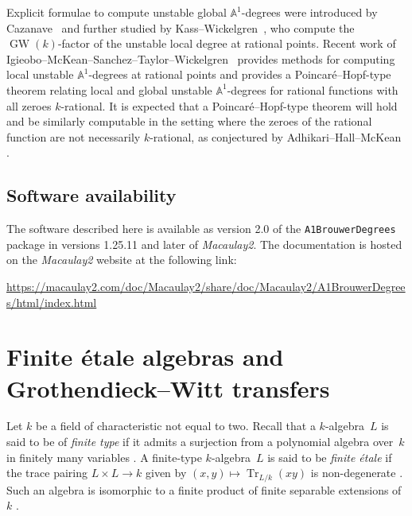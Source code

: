 \documentclass[12pt]{amsart}
\theoremstyle{definition}
\DeclareMathOperator{\GW}{GW}
\DeclareMathOperator{\Tr}{Tr}
\begin{document}
Explicit formulae to compute unstable global $\mathbb{A}^{1}$-degrees were introduced by Cazanave~\cite{Cazanave} and further studied by Kass--Wickelgren~\cite{KWClassical}, who compute the $\GW(k)$-factor of the unstable local degree at rational points. Recent work of Igieobo--McKean--Sanchez--Taylor--Wickelgren~\cite{IMSTW} provides methods for computing local unstable $\mathbb{A}^{1}$-degrees at rational points and provides a Poincar\'{e}--Hopf-type theorem relating local and global unstable $\mathbb{A}^{1}$-degrees for rational functions with all zeroes $k$-rational. It is expected that a Poincar\'{e}--Hopf-type theorem will hold and be similarly computable in the setting where the zeroes of the rational function are not necessarily $k$-rational, as conjectured by Adhikari--Hall--McKean \cite[Conjecture~4.1]{AHM}. 

\subsection{Software availability}\label{subsec: software availibility}
The software described here is available as version 2.0 of the \texttt{A1BrouwerDegrees} package in versions 1.25.11 and later of \emph{Macaulay2}. The documentation is hosted on the \emph{Macaulay2} website at the following link:
{\fontsize{10}{\baselineskip}\selectfont
\begin{center}
\url{https://macaulay2.com/doc/Macaulay2/share/doc/Macaulay2/A1BrouwerDegrees/html/index.html}
\end{center}
\normalsize}

\section{Finite \'{e}tale algebras and Grothendieck--Witt transfers}\label{sec: etale and transfers}

Let $k$ be a field of characteristic not equal to two. Recall that a $k$-algebra~$L$ is said to be of \emph{finite type} if it admits a surjection from a polynomial algebra over~$k$ in finitely many variables \cite[\href{https://stacks.math.columbia.edu/tag/00F3}{Tag~00F3}]{stacks-project}. A finite-type $k$-algebra~$L$ is said to be \emph{finite \'{e}tale} if the trace pairing $L\times L\to k$ given by $(x,y)\mapsto\Tr_{L/k}(xy)$ is non-degenerate \cite[\href{https://stacks.math.columbia.edu/tag/0BVH}{Tag~0BVH}]{stacks-project}. Such an algebra is isomorphic to a finite product of finite separable extensions of~$k$ \cite[\href{https://stacks.math.columbia.edu/tag/00U3}{Tag~00U3}]{stacks-project}.
\end{document}
